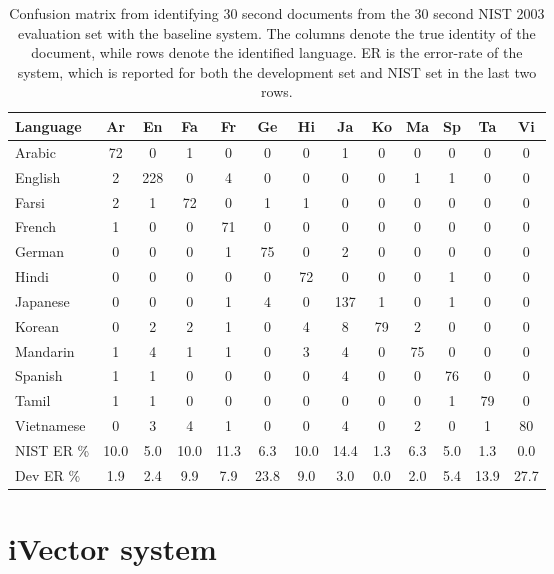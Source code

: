 \begin{table}[hbt!]
\begin{tabular}{| l | c | c | c | c | c | c | c | c | c | c | c | c |}
\hline
Language &Ar & En & Fa & Fr & Ge & Hi & Ja & Ko & Ma & Sp & Ta & Vi \\
\hline
Arabic       & 72 & 0 & 1 & 0 & 0 & 0 & 1 & 0 & 0 & 0 & 0 & 0 \\
English       & 2 & 228 & 0 & 4 & 0 & 0 & 0 & 0 & 1 & 1 & 0 & 0 \\
Farsi          & 2 & 1 & 72 & 0 & 1 & 1 & 0 & 0 & 0 & 0 & 0 & 0 \\
French       & 1 & 0 & 0 & 71 & 0 & 0 & 0 & 0 & 0 & 0 & 0 & 0 \\
German      & 0 & 0 & 0 & 1 & 75 & 0 & 2 & 0 & 0 & 0 & 0 & 0 \\
Hindi          & 0 & 0 & 0 & 0 & 0 & 72 & 0 & 0 & 0 & 1 & 0 & 0 \\
Japanese   & 0 & 0 & 0 & 1 & 4 & 0 & 137 & 1 & 0 & 1 & 0 & 0 \\
Korean       & 0 & 2 & 2 & 1 & 0 & 4 & 8 & 79 & 2 & 0 & 0 & 0 \\
Mandarin    & 1 & 4 & 1 & 1 & 0 & 3 & 4 &  0 & 75 & 0 & 0 & 0 \\
Spanish       & 1 & 1 & 0 & 0 &  0 & 0 & 4 & 0 & 0 & 76 & 0 & 0 \\
Tamil           & 1 & 1 & 0 & 0 & 0 & 0 & 0 & 0 & 0 & 1 & 79 & 0 \\
Vietnamese & 0 & 3 & 4 & 1 & 0 & 0 & 4 & 0 & 2 & 0 & 1  & 80 \\
\hline
NIST ER \% & 10.0 & 5.0 & 10.0 & 11.3 & 6.3 & 10.0 & 14.4 & 1.3 & 6.3 & 5.0 & 1.3 & 0.0 \\
\hline
Dev ER \% & 1.9 & 2.4 & 9.9 & 7.9 & 23.8 & 9.0 & 3.0 & 0.0 & 2.0 & 5.4 & 13.9 & 27.7 \\
\hline
\end{tabular}
\caption{Confusion matrix from identifying 30 second documents from the 30 second NIST 2003 evaluation set with the baseline system. The columns denote the true identity of the document, while rows denote the identified language. ER is the error-rate of the system, which is reported for both the development set and NIST set in the last two rows.}
\label{baseidresults}
\end{table}

\section{iVector system}

